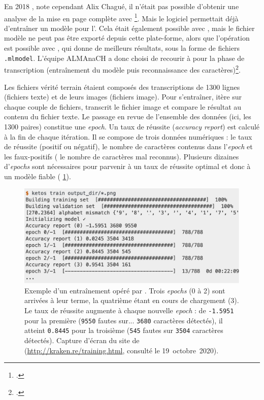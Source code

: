 \og En 2018 \fg, note cependant Alix Chagué, \og il n’était pas possible d’obtenir une analyse de la mise en page complète avec \kraken \fg{}\footcite{chague2}. Mais le logiciel permettait déjà d'entraîner un modèle pour l'\ocr. Cela était également possible avec \transkribus, mais le fichier modèle ne peut pas être exporté depuis cette plate-forme, alors que l'opération est possible avec \kraken{}, qui donne de meilleurs résultats, sous la forme de fichiers \texttt{.mlmodel}. L'équipe ALMAnaCH a donc choisi de recourir à \kraken{} pour la phase de transcription (entraînement du modèle puis reconnaissance des caractères)\footcite{chague2}.

Les fichiers \og vérité terrain \fg{} étaient composés des transcriptions de 1300 lignes (fichiers texte) et de leurs images (fichiers image). Pour s'entraîner, \kraken{} itère sur chaque couple de fichiers, transcrit le fichier image et compare le résultat au contenu du fichier texte. Le passage en revue de l'ensemble des données (ici, les 1300 paires) constitue une \textit{epoch}. Un taux de réussite (\textit{accuracy report}) est calculé à la fin de chaque itération. Il se compose de trois données numériques : le taux de réussite (positif ou négatif), le nombre de caractères contenus dans l'\textit{epoch} et les faux-positifs (\cad{} le nombre de caractères mal reconnus). Plusieurs dizaines d'\textit{epochs} sont nécessaires pour parvenir à un taux de réussite optimal et donc à un modèle fiable (\fig{} \ref{fig:kraken_training}).

\begin{figure}
    \centering
    \includegraphics[width=15cm]{img/kraken_training.png}
    \caption[Exemple d'un entraînement opéré par \kraken]{Exemple d'un entraînement opéré par \kraken. Trois \textit{epochs} (\nos{}0 à 2) sont arrivées à leur terme, la quatrième étant en cours de chargement (\no{}3). Le taux de réussite augmente à chaque nouvelle \textit{epoch} : de \texttt{-1.5951} pour la première (\texttt{9550} fautes sur... \texttt{3680} caractères détectés), il atteint \texttt{0.8445} pour la troisième (\texttt{545} fautes sur \texttt{3504} caractères détectés). Capture d'écran du site de \kraken{} (\url{http://kraken.re/training.html}, consulté le 19~octobre~2020).}
    \label{fig:kraken_training}
\end{figure}

